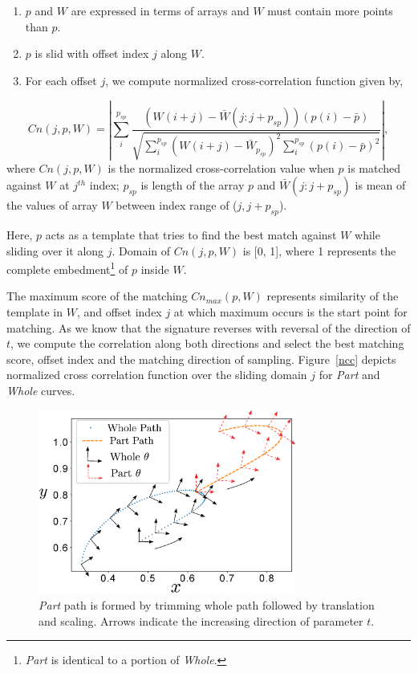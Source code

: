 \documentclass[twocolumn,10pt]{asme2ej}
\begin{document}
\begin{enumerate}
  \item $p$ and $W$ are expressed in terms of arrays and $W$ must contain more points than $p$.
  \item $p$ is slid with offset index $j$ along $W$.
  \item For each offset $j$, we compute normalized cross-correlation\cite{lewis1995fast} function given by,
\end{enumerate}
\vspace{-0.6cm}
\begin{equation}\label{nccEq}
  Cn(j, p, W) = |\sum_{i}^{p_{sp}} \frac{(W(i+j) - \bar{W}(j : j + p_{sp}))(p(i) - \bar{p})}{\sqrt{\sum_{i}^{p_{sp}}{(W(i+j) - \bar{W}_{p_{sp}})}^2\sum_{i}^{p_{sp}}{(p(i) - \bar{p})}^2}} |,
\end{equation}
where $Cn(j, p, W)$ is the normalized cross-correlation value when $p$ is matched against $W$ at $j^{th}$ index; $p_{sp}$ is length of the array $p$ and $\bar{W}(j:j + p_{sp})$ is mean of the values of array $W$ between index range of ($j, j+p_{sp}$).

Here, $p$ acts as a template that tries to find the best match against $W$ while sliding over it along $j$.
Domain of $Cn(j, p, W)$ is [0, 1], where 1 represents the complete embedment\footnote{\emph{Part} is identical to a portion of \emph{Whole}.} of $p$ inside $W$.

The maximum score of the matching $Cn_{max}(p, W)$ represents similarity of the template in $W$, and offset index $j$ at which maximum occurs is the start point for matching.
As we know that the signature reverses with reversal of the direction of $t$, we compute the correlation along both directions and select the best matching score, offset index and the matching direction of sampling.
Figure~\ref{ncc} depicts normalized cross correlation function over the sliding domain $j$ for \emph{Part} and \emph{Whole} curves.

\begin{figure}
\centering
\includegraphics[width=240pt]{figure/fig_whole_part.eps}
  \caption{\emph{Part} path is formed by trimming whole path followed by translation and scaling. Arrows indicate the increasing direction of parameter $t$.}
\label{wholePart}
\end{figure}
\end{document}
